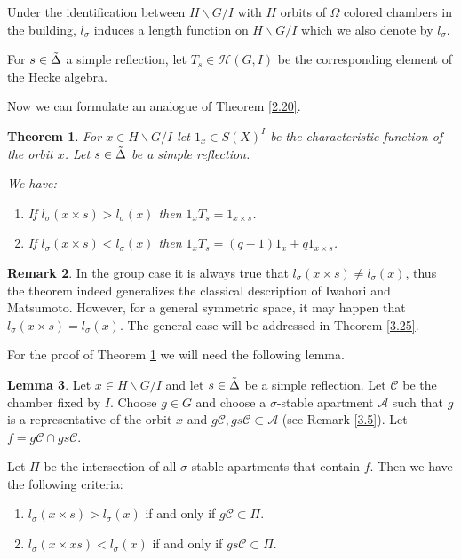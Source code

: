 \documentclass[12pt]{article}
\newcommand{\A}{\mathcal{A}}
\newcommand{\C}{\mathcal{C}}
\newcommand{\<}{\langle}
\renewcommand{\>}{\rangle}
\theoremstyle{plain}
\newtheorem{theorem}{Theorem}[section] %
\theoremstyle{definition}
\newtheorem{lemma}[theorem]{Lemma}
\newtheorem{Remark}[theorem]{Remark}
\begin{document}
Under the identification between $H\backslash G/I$ with $H$ orbits of $\Omega$ colored chambers in the building, $l_\sigma$ induces a length function on $H\backslash G/I$ which we also denote by $l_\sigma$.

For $s\in \Tilde{\Delta}$ a simple reflection, let $T_s\in \mathcal{H}(G,I)$ be the corresponding element of the Hecke algebra. 

Now we can formulate an analogue of Theorem \ref{2.20}.

\begin{theorem}\label{simpleformula}
For $x\in H\backslash G/I$ let $1_x\in S(X)^I$ be the characteristic function of the orbit $x$. Let $s\in \Tilde{\Delta}$ be a simple reflection.

We have:
\begin{enumerate}
 \item If $l_\sigma(x\times s)>l_\sigma(x)$ then $1_xT_s=1_{x\times s}$.
    \item If $l_\sigma(x\times s)<l_\sigma(x)$ then $1_xT_s=(q-1)1_x+q1_{x\times s}$.
\end{enumerate}

\end{theorem}

\begin{Remark}
In the group case it is always true that $l_\sigma(x\times s) \ne l_\sigma(x)$, thus the theorem indeed generalizes the classical description of Iwahori and Matsumoto. However, for a general symmetric space, it may happen that $l_\sigma(x\times s)=l_\sigma(x)$. The general case will be addressed in Theorem \ref{3.25}.
\end{Remark}

For the proof of Theorem \ref{simpleformula} we will need the following lemma.

\begin{lemma}\label{3.9}
Let $x\in H\backslash G/I$ and let $s\in \Tilde{\Delta}$ be a simple reflection.
Let $\C$ be the chamber fixed by $I$. Choose $g\in G$ and choose a $\sigma$-stable apartment $\A$ such that $g$ is a representative of the orbit $x$ and $g\C,gs\C\subset\A$ (see Remark \ref{3.5}). Let $f=g\C\cap gs\C$.

Let $\Pi$ be the intersection of all $\sigma$ stable apartments that contain $f$.
Then we have the following criteria:
\begin{enumerate}
\item $l_\sigma(x \times s)>l_\sigma(x)$ if and only if $g\C\subset \Pi$.
    \item $l_\sigma(x\times xs)<l_\sigma(x)$ if and only if $gs\C\subset \Pi$.
    \end{enumerate}

\end{lemma}
\end{document}
